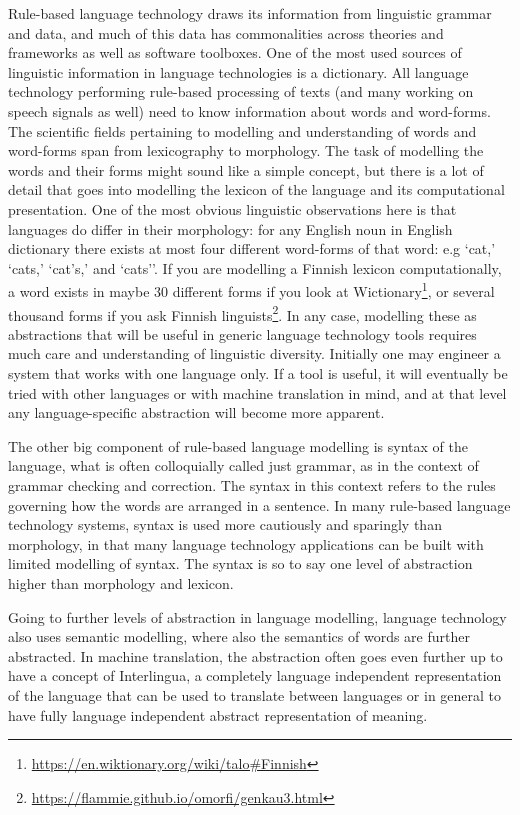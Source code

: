 \documentclass[free]{flammie}
\begin{document}
Rule-based language technology draws its information from linguistic grammar and
data, and much of this data has commonalities across theories and frameworks as
well as software toolboxes. One of the most used sources of linguistic
information in language technologies is a dictionary. All language technology
performing rule-based processing of texts (and many working on speech signals as
well) need to know information about words and word-forms. The scientific fields
pertaining to modelling and understanding of words and word-forms span from
lexicography to morphology. The task of modelling the words and their forms
might sound like a simple concept, but there is a lot of detail that goes into
modelling the lexicon of the language and its computational presentation. One of
the most obvious linguistic observations here is that languages do differ in
their morphology: for any English noun in English dictionary there exists at
most four different word-forms of that word: e.g ‘cat,’ ‘cats,’ ‘cat’s,’ and
‘cats’’. If you are modelling a Finnish lexicon computationally, a word exists
in maybe 30 different forms if you look at
Wictionary\footnote{\url{https://en.wiktionary.org/wiki/talo\#Finnish}}, or
several thousand forms if you ask Finnish
linguists\footnote{\url{https://flammie.github.io/omorfi/genkau3.html}}. In any
case, modelling these as abstractions that will be useful in generic language
technology tools requires much care and understanding of linguistic diversity.
Initially one may engineer a system that works with one language only. If a tool
is useful, it will eventually be tried with other languages or with machine
translation in mind, and at that level any language-specific abstraction will
become more apparent.

The other big component of rule-based language modelling is syntax of the
language, what is often colloquially called just grammar, as in the context of
grammar checking and correction. The syntax in this context refers to the rules
governing how the words are arranged in a sentence. In many rule-based language
technology systems, syntax is used more cautiously and sparingly than
morphology, in that many language technology applications can be built with
limited modelling of syntax. The syntax is so to say one level of abstraction
higher than morphology and lexicon.

Going to further levels of abstraction in language modelling, language
technology also uses semantic modelling, where also the semantics of words are
further abstracted. In machine translation, the abstraction often goes even
further up to have a concept of Interlingua, a completely language independent
representation of the language that can be used to translate between languages
or in general to have fully language independent abstract representation of
meaning.
\end{document}
